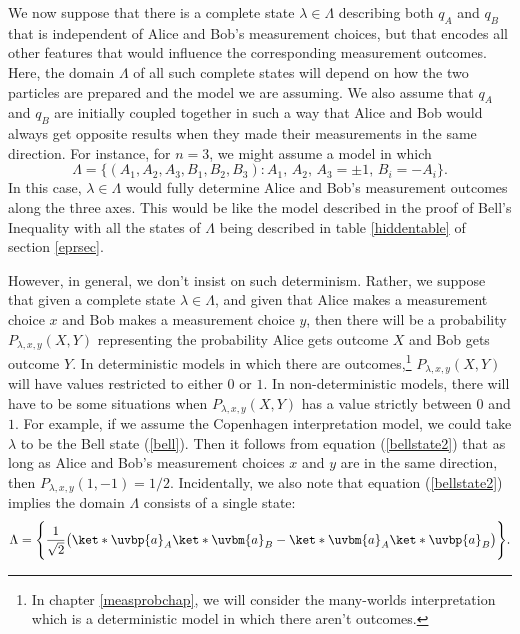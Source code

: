 \documentclass[12pt]{report}
\begin{document}
We now suppose that there is a complete state $\lambda\in\Lambda$ %
%
describing both $q_A$ and $q_B$ that is independent of Alice and Bob's measurement choices, but that encodes all other features that would influence the corresponding measurement outcomes. Here, the domain $\Lambda$ of all such complete states will depend on how the two particles are prepared and the model we are assuming. We also assume that  $q_A$ and $q_B$ are initially coupled together in such a way that Alice and Bob would always get opposite results when they made their measurements in the same direction. For instance, for $n=3$, we might assume a model in which 
\begin{equation}\label{bellLambda}
\Lambda=\big\{(A_1, A_2, A_3 ,B_1, B_2, B_3):A_1,\, A_2,\, A_3=\pm1,\, B_i=-A_i\big\}.
\end{equation}
 In this case, $\lambda\in\Lambda$ would fully determine Alice and Bob's measurement outcomes along the three axes. This would be like the model described in the proof of Bell's Inequality with all the states of $\Lambda$ being described in table \ref{hiddentable} of section \ref{eprsec}. 
 
However, in general, we don't insist on such determinism. Rather, we suppose that given a complete state $\lambda\in\Lambda$, and given that Alice makes a measurement choice $x$ and Bob makes a measurement choice $y$, then there will be a probability $P_{\lambda,x,y}(X , Y)$ %
%
representing the probability Alice gets outcome $X$ and Bob gets outcome $Y$. In deterministic models in which there are outcomes,\footnote{In chapter \ref{measprobchap}, we will consider the many-worlds interpretation which is a deterministic model in which there aren't outcomes.} $P_{\lambda,x,y}(X , Y)$ will have values restricted to either $0$ or $1$. In non-deterministic models, there will have to be some situations when $P_{\lambda,x,y}(X, Y)$ has a value strictly between $0$ and $1$. For example, if we assume the Copenhagen interpretation model, we could take $\lambda$ to be the Bell state (\ref{bell}). Then it follows from equation (\ref{bellstate2}) that as long as Alice and Bob's measurement choices $x$ and $y$ are in the same direction, then $P_{\lambda,x,y}(1,-1)=1/2$. Incidentally, we also note that equation (\ref{bellstate2}) implies the domain $\Lambda$ consists of a single state:
\begin{equation}\label{quantumLambda}
\Lambda=\Bigg\{\frac{1}{\sqrt{2}}\big(\ket*{\uvbp{a}}_A\ket*{\uvbm{a}}_B-\ket*{\uvbm{a}}_A\ket*{\uvbp{a}}_B\big)\Bigg\}.
\end{equation}
\end{document}
